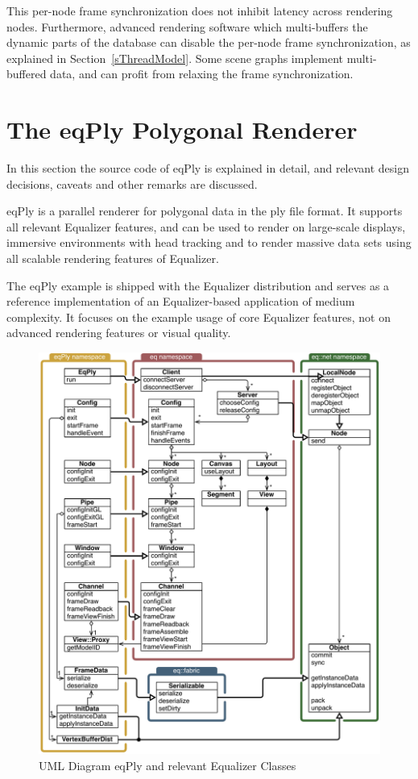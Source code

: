 \documentclass[10pt,a4]{scrartcl}
\newcommand{\sref}[1]{Section~\ref{#1}}
\begin{document}
This per-node frame synchronization does not inhibit latency across
rendering nodes. Furthermore, advanced rendering software which
multi-buffers the dynamic parts of the database can disable the per-node
frame synchronization, as explained in \sref{sThreadModel}. Some scene
graphs implement multi-buffered data, and can profit from relaxing the
frame synchronization.



\section{\label{sEqPly}The eqPly Polygonal Renderer}

In this section the source code of \textsf{eqPly} is explained in
detail, and relevant design decisions, caveats and other remarks are
discussed.

\textsf{eqPly} is a parallel renderer for polygonal data in the
\textsf{ply} file format. It supports all relevant Equalizer features,
and can be used to render on large-scale displays, immersive
environments with head tracking and to render massive data sets using
all scalable rendering features of Equalizer.

The \textsf{eqPly} example is shipped with the Equalizer distribution
and serves as a reference implementation of an Equalizer-based
application of medium complexity. It focuses on the example usage of
core Equalizer features, not on advanced rendering features or visual
quality.

\begin{figure}[ht!]\center
  \includegraphics[width=.9\textwidth]{images/uml}
  {\caption{\label{fUml}UML Diagram eqPly and relevant Equalizer Classes}}
\end{figure}
\end{document}
